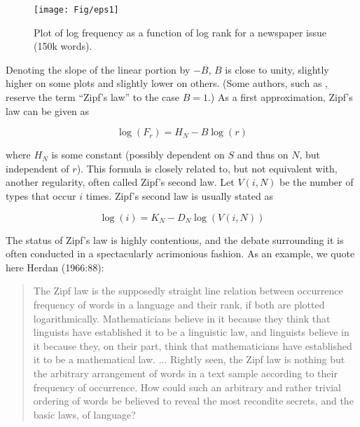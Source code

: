 \begin{figure}[htbp]
\begin{center}
\texttt{[image: Fig/eps1]}
\caption{Plot of log frequency as a function of log rank for a newspaper issue (150k words).}
\end{center}
\end{figure}

\vspace*{-6mm}
\noindent
Denoting the slope of the linear portion by $-B$, $B$ is close to unity,
slightly higher on some plots and slightly lower on others. (Some authors,
such as , reserve the term ``Zipf's law'' to the case
$B=1$.) As a first approximation, Zipf's law can be given as

\vspace*{-3mm}
\begin{equation} %
\log(F_r) = H_N - B\log(r)
\end{equation}

\noindent
where $H_N$ is some constant (possibly dependent on $S$ and thus on $N$, but
independent of $r$).  This formula is closely related to, but not equivalent
with, another regularity, often called Zipf's second law. Let $V(i,N)$ be the
number of types that occur $i$ times. Zipf's second law is usually stated as

\begin{equation} %
\log(i) = K_N - D_N\log(V(i,N))
\end{equation} 

\noindent
The status of Zipf's law is highly contentious, and the debate surrounding
it is often conducted in a spectacularly acrimonious fashion. As an example,
we quote here Herdan (1966:88): \nocite{Herdan:1966}

\begin{quote}
The Zipf law is the supposedly straight line relation between occurrence
frequency of words in a language and their rank, if both are plotted
logarithmically. Mathematicians believe in it because they think that
linguists have established it to be a linguistic law, and linguists believe in
it because they, on their part, think that mathematicians have established it
to be a mathematical law. ...  Rightly seen, the Zipf law is nothing but the
arbitrary arrangement of words in a text sample according to their frequency
of occurrence.  How could such an arbitrary and rather trivial ordering of
words be believed to reveal the most recondite secrets, and the basic laws, of
language?
\end{quote}

